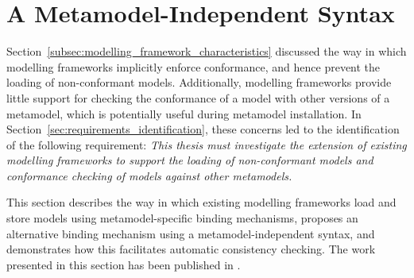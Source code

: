 
\section{A Metamodel-Independent Syntax}
\label{sec:mmi_syntax}
Section~\ref{subsec:modelling_framework_characteristics} discussed the way in which modelling frameworks implicitly enforce conformance, and hence prevent the loading of non-conformant models. Additionally, modelling frameworks provide little support for checking the conformance of a model with other versions of a metamodel, which is potentially useful during metamodel installation. In Section~\ref{sec:requirements_identification}, these concerns led to the identification of the following requirement: \emph{This thesis must investigate the extension of existing modelling frameworks to support the loading of non-conformant models and conformance checking of models against other metamodels.}

This section describes the way in which existing modelling frameworks load and store models using metamodel-specific binding mechanisms, proposes an alternative binding mechanism using a metamodel-independent syntax, and demonstrates how this facilitates automatic consistency checking. The work presented in this section has been published in \cite{rose09enhanced}.

